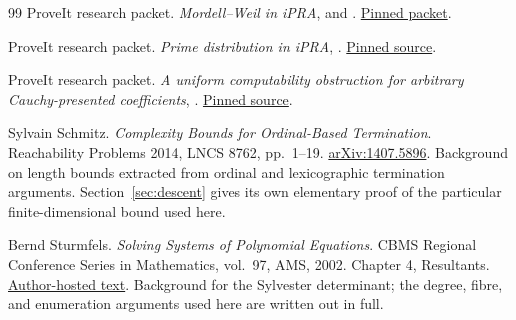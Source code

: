 \begin{thebibliography}{99}
ProveIt research packet. \emph{Mordell--Weil in iPRA},
 and
.
\href{https://github.com/VladimirReshetnikov/ProveIt/tree/b0f6f535ffc16324683fef2c263260a88ae03755/Logic/PrimitiveRecursiveArithmetic/docs/proofs/diophantine-number-theory/mordell_weil_ipra}{Pinned packet}.

ProveIt research packet. \emph{Prime distribution in iPRA},
.
\href{https://github.com/VladimirReshetnikov/ProveIt/blob/b0f6f535ffc16324683fef2c263260a88ae03755/Logic/PrimitiveRecursiveArithmetic/docs/proofs/analytic-number-theory/prime_distribution_ipra/paper/sections/07_sw_bv.tex}{Pinned source}.

ProveIt research packet. \emph{A uniform computability obstruction for arbitrary Cauchy-presented coefficients},
.
\href{https://github.com/VladimirReshetnikov/ProveIt/blob/b0f6f535ffc16324683fef2c263260a88ae03755/Logic/PrimitiveRecursiveArithmetic/docs/proofs/algebra/puiseux_ipra/evidence/scope_obstruction.md}{Pinned source}.

Sylvain Schmitz. \emph{Complexity Bounds for Ordinal-Based Termination}.
Reachability Problems 2014, LNCS 8762, pp.~1--19.
\href{https://arxiv.org/abs/1407.5896}{arXiv:1407.5896}.
Background on length bounds extracted from ordinal and lexicographic
termination arguments. Section~\ref{sec:descent} gives its own elementary
proof of the particular finite-dimensional bound used here.

Bernd Sturmfels. \emph{Solving Systems of Polynomial Equations}.
CBMS Regional Conference Series in Mathematics, vol.~97, AMS, 2002.
Chapter 4, Resultants.
\href{https://math.berkeley.edu/~bernd/cbms.pdf}{Author-hosted text}.
Background for the Sylvester determinant; the degree, fibre, and
enumeration arguments used here are written out in full.
\end{thebibliography}
